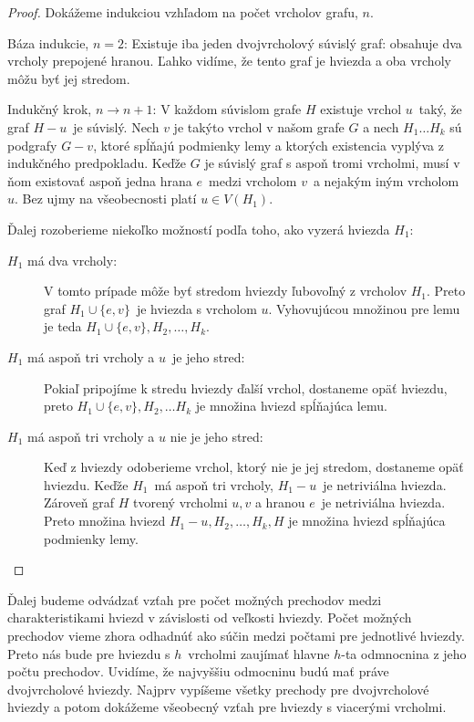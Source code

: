 \begin{proof}
    Dokážeme indukciou vzhľadom na počet vrcholov grafu, $n$.

    Báza indukcie, $n = 2$: Existuje iba jeden dvojvrcholový súvislý
    graf: obsahuje dva vrcholy prepojené hranou. Ľahko vidíme, že tento graf je hviezda a oba vrcholy
    môžu byť jej stredom.

    Indukčný krok, $n \to n+1$: V každom súvislom grafe $H$ existuje vrchol $u$ taký, že graf $H - u$ je súvislý.
    Nech $v$ je takýto vrchol v našom grafe $G$ a nech $H_1 \ldots H_k$ sú podgrafy $G-v$, ktoré spĺňajú
    podmienky lemy a ktorých existencia vyplýva z indukčného predpokladu. Keďže $G$ je súvislý graf s aspoň
    tromi vrcholmi, musí v ňom existovať aspoň jedna hrana $e$ medzi vrcholom $v$ a nejakým iným vrcholom $u$.
    Bez ujmy na všeobecnosti platí $u \in V(H_1)$.

    Ďalej rozoberieme niekoľko možností podľa toho, ako vyzerá hviezda $H_1$:

    \begin{description}
        \item[$H_1$ má dva vrcholy:] V tomto prípade môže byť stredom hviezdy ľubovoľný z vrcholov $H_1$.
        Preto graf $H_1 \cup \{e, v\}$ je hviezda s vrcholom $u$. Vyhovujúcou množinou pre lemu je teda
        $H_1 \cup \{e, v\}, H_2, \ldots, H_k$.
        \item[$H_1$ má aspoň tri vrcholy a $u$ je jeho stred:] Pokiaľ pripojíme k stredu hviezdy ďalší
        vrchol, dostaneme opäť hviezdu, preto $H_1 \cup \{e, v\}, H_2, \ldots H_k$ je množina hviezd
        spĺňajúca lemu.
        \item[$H_1$ má aspoň tri vrcholy a $u$ nie je jeho stred:] Keď z hviezdy odoberieme vrchol, ktorý
        nie je jej stredom, dostaneme opäť hviezdu. Keďže $H_1$ má aspoň tri vrcholy, $H_1 - u$ je netriviálna
        hviezda. Zároveň graf $H$ tvorený vrcholmi $u, v$ a hranou $e$ je netriviálna hviezda. Preto množina
        hviezd $H_1 - u, H_2, \ldots, H_k, H$ je množina hviezd spĺňajúca podmienky lemy.
    \end{description}
\end{proof}

Ďalej budeme odvádzať vzťah pre počet možných prechodov medzi charakteristikami hviezd v závislosti od veľkosti hviezdy.
Počet možných prechodov vieme zhora odhadnúť ako súčin medzi počtami pre jednotlivé hviezdy. Preto nás bude pre hviezdu
s $h$ vrcholmi zaujímať hlavne $h$-ta odmnocnina z jeho počtu prechodov. Uvidíme, že najvyššiu odmocninu budú
mať práve dvojvrcholové hviezdy. Najprv vypíšeme všetky prechody pre dvojvrcholové hviezdy a potom dokážeme všeobecný
vzťah pre hviezdy s viacerými vrcholmi.

